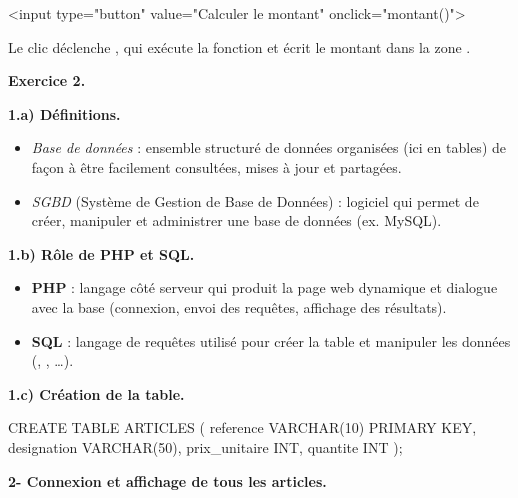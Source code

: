 \begin{codehtml}
<input type="button" value="Calculer le montant" onclick="montant()">
\end{codehtml}

Le clic déclenche , qui exécute la fonction et écrit le
montant dans la zone .

\bigskip
\textbf{Exercice 2.}

\smallskip
\textbf{1.a) Définitions.}
\begin{itemize}
\item \emph{Base de données} : ensemble structuré de données organisées (ici en tables)
de façon à être facilement consultées, mises à jour et partagées.
\item \emph{SGBD} (Système de Gestion de Base de Données) : logiciel qui permet de créer,
manipuler et administrer une base de données (ex. MySQL).
\end{itemize}

\textbf{1.b) Rôle de PHP et SQL.}
\begin{itemize}
\item \textbf{PHP} : langage côté serveur qui produit la page web dynamique et dialogue
avec la base (connexion, envoi des requêtes, affichage des résultats).
\item \textbf{SQL} : langage de requêtes utilisé pour créer la table et manipuler les
données (, , …).
\end{itemize}

\textbf{1.c) Création de la table.}

\begin{codesql}
CREATE TABLE ARTICLES (
    reference     VARCHAR(10) PRIMARY KEY,
    designation   VARCHAR(50),
    prix_unitaire INT,
    quantite      INT
);
\end{codesql}

\textbf{2- Connexion et affichage de tous les articles.}


